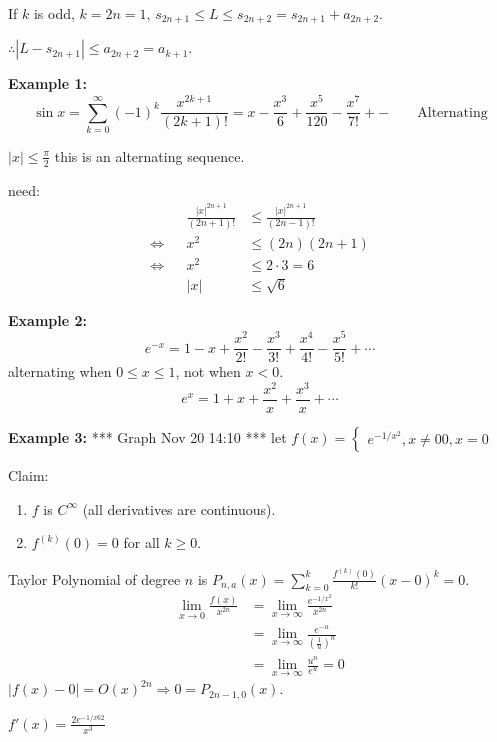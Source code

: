 \documentclass[12pt]{article}
\newcommand{\abs}[1]{\left| #1 \right|}
\theoremstyle{plain}
\newcommand{\dlim}{\displaystyle\lim\limits}
\begin{document}
If $k$ is odd, $k=2n=1$, $s_{2n+1} \leq L\leq s_{2n+2} =s_{2n+1} +a_{2n+2}$.

$\therefore \abs{L-s_{2n+1}}\leq a_{2n+2} = a_{k+1}$. 

{\color{Brown}
	\textbf{Example 1: }
	\[
		\sin x = \sum_{k=0}^{\infty} (-1)^k\frac{x^{2k+1}}{(2k+1)!}
		=x-\frac{x^3}6+\frac{x^5}{120}-\frac{x^7}{7!}+- \qquad\text{Alternating}
	\]

	$\abs x \leq \frac{\pi}2$ this is an alternating sequence. 

	need: 
	\begin{align*}
				 & &\frac{\abs{x}^{2n+1}}{(2n+1)!}
				 &\leq \frac{\abs x^{2n+1}}{(2n-1)!}\\
		\iff & & x^2		&\leq (2n)(2n+1)		\\
		\iff & & x^2		&\leq 2\cdot 3	= 6 \\
				 & & \abs	x	&\leq \sqrt 6
	\end{align*}
	




	\textbf{Example 2: }
	\[
		e^{-x}=1-x+\frac{x^2}{2!}-\frac{x^3}{3!}+
		\frac{x^4}{4!}-\frac{x^5}{5!}+\cdots
	\]
	alternating when $0\leq x\leq 1$, not when $x<0$. 	
	\[
		e^x = 1+x+\frac{x^2}x+\frac{x^3}{x}+\cdots
	\]

	\textbf{Example 3: } *** Graph Nov 20 14:10 ***
	let 
	$f(x) = 
	\begin{cases}
		e^{-1/x^2}, x\neq 0
		0, x=0 
	\end{cases}
	$

	Claim: 
	\begin{enumerate}
		\item $f$ is $C^{\infty}$ (all derivatives are continuous). 
		\item $f^{(k)} (0) = 0$ for all $k\geq 0$. 
	\end{enumerate}

	Taylor Polynomial of degree $n$ is $P_{n,a}(x) = \sum_{k=0}^k
	\frac{f^{(k)}(0)}{k!} (x-0)^k = 0$. 
	\begin{align*}
		\dlim_{x\to 0}\frac{f(x)}{x^{2n}} 
		&=\dlim_{x\to \infty}\frac{e^{-1/x^2}}{x^{2n}}\\
		&=\dlim_{x\to \infty} \frac{e^{-u}}{(\frac1u)^n}\\
		&=\dlim_{x\to \infty} \frac{u^n}{e^u} = 0
	\end{align*}
  $\abs{f(x) - 0} = O(x)^{2n}\Rightarrow 0 = P_{2n-1,0} (x)$.

  $f'(x) = \frac{2e^{-1/x62}}{x^3}$

}
\end{document}
